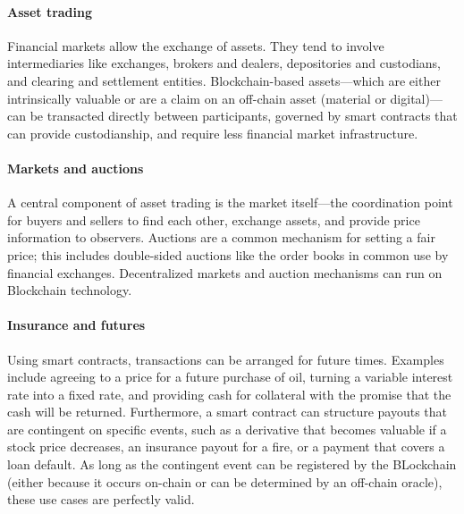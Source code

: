 \paragraph{Asset trading}

Financial markets allow the exchange of assets. 
They tend to involve intermediaries like exchanges, brokers and dealers, depositories and custodians, and clearing and settlement entities. 
Blockchain-based assets---which are either intrinsically valuable or are a claim on an off-chain asset (material or digital)---can be transacted directly between participants, governed by smart contracts that can provide custodianship, and require less financial market infrastructure.

\paragraph{Markets and auctions}

A central component of asset trading is the market itself---the coordination point for buyers and sellers to find each other, exchange assets, and provide price information to observers.
Auctions are a common mechanism for setting a fair price; this includes double-sided auctions like the order books in common use by financial exchanges. 
Decentralized markets and auction mechanisms can run on Blockchain technology.

\paragraph{Insurance and futures}
Using smart contracts, transactions can be arranged for future times.
Examples include agreeing to a price for a future purchase of oil, turning a 
variable interest rate into a fixed rate, and providing cash for collateral 
with the promise that the cash will be returned.
Furthermore, a smart contract can structure payouts that are contingent on 
specific events, such as a derivative that becomes valuable if a stock price 
decreases, an insurance payout for a fire, or a payment that covers a loan 
default.
As long as the contingent event can be registered by the BLockchain (either 
because it occurs on-chain or can be determined by an off-chain oracle), these 
use cases are perfectly valid.

